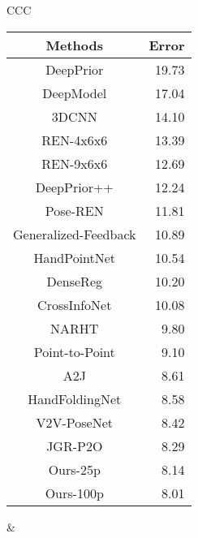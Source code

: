 \documentclass{article}
\begin{document}
\begin{table}[!h]
\begin{tabularx}{\columnwidth}{CCC}
{\begin{tabular}{cr}
\hline
                       Methods                        &   Error  \\
\hline
         DeepPrior \cite{oberweger2015hands}          &        19.73 \\
            DeepModel \cite{zhou2016model}            &        17.04 \\
                3DCNN \cite{ge20173d}                 &        14.10  \\
            REN-4x6x6 \cite{guo2017region}            &        13.39 \\
           REN-9x6x6 \cite{wang2018region}            &        12.69 \\
     DeepPrior++ \cite{oberweger2017deepprior++}      &        12.24 \\
             Pose-REN \cite{chen2020pose}             &        11.81 \\
 Generalized-Feedback \cite{oberweger2019generalized} &        10.89 \\
            HandPointNet \cite{ge2018hand}            &        10.54 \\
             DenseReg \cite{wan2018dense}             &        10.20  \\
        CrossInfoNet \cite{du2019crossinfonet}        &        10.08 \\
              NARHT \cite{huang2020hand}              &         9.80  \\
          Point-to-Point \cite{ge2018point}           &         9.10  \\
               A2J \cite{xiong2019a2j}                &         8.61 \\
    HandFoldingNet \cite{cheng2021handfoldingnet}     &         8.58 \\
            V2V-PoseNet \cite{moon2018v2v}            &         8.42 \\
              JGR-P2O \cite{fang2020jgr}              &         8.29 \\
               Ours-25p                               &        8.14 \\
              Ours-100p                                 &       8.01 \\
\hline
\end{tabular}}
&
\end{tabularx}
\end{table}
\end{document}
